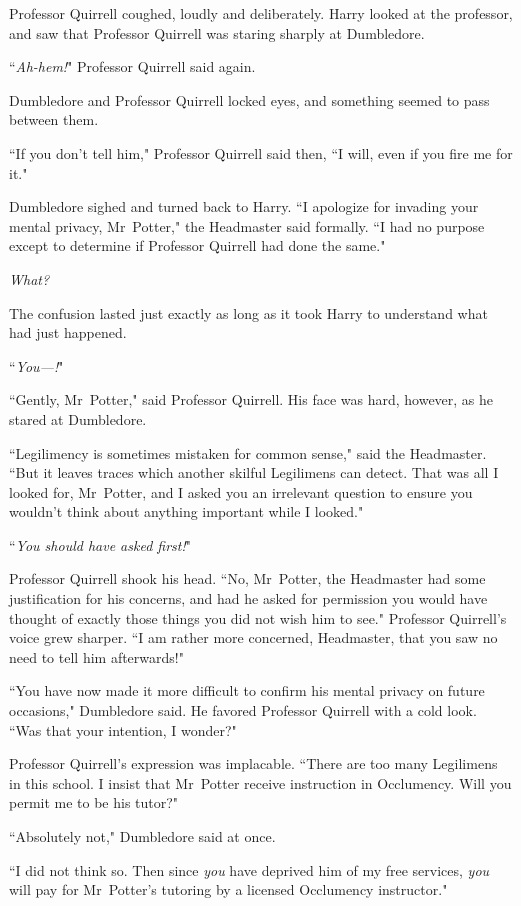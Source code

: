Professor Quirrell coughed, loudly and deliberately. Harry looked at the professor, and saw that Professor Quirrell was staring sharply at Dumbledore.

``\emph{Ah-hem!}" Professor Quirrell said again.

Dumbledore and Professor Quirrell locked eyes, and something seemed to pass between them.

``If you don't tell him," Professor Quirrell said then, ``I will, even if you fire me for it."

Dumbledore sighed and turned back to Harry. ``I apologize for invading your mental privacy, Mr~Potter," the Headmaster said formally. ``I had no purpose except to determine if Professor Quirrell had done the same."

\emph{What?}

The confusion lasted just exactly as long as it took Harry to understand what had just happened.

``\emph{You—!}"

``Gently, Mr~Potter," said Professor Quirrell. His face was hard, however, as he stared at Dumbledore.

``Legilimency is sometimes mistaken for common sense," said the Headmaster. ``But it leaves traces which another skilful Legilimens can detect. That was all I looked for, Mr~Potter, and I asked you an irrelevant question to ensure you wouldn't think about anything important while I looked."

``\emph{You should have asked first!}"

Professor Quirrell shook his head. ``No, Mr~Potter, the Headmaster had some justification for his concerns, and had he asked for permission you would have thought of exactly those things you did not wish him to see." Professor Quirrell's voice grew sharper. ``I am rather more concerned, Headmaster, that you saw no need to tell him afterwards!"

``You have now made it more difficult to confirm his mental privacy on future occasions," Dumbledore said. He favored Professor Quirrell with a cold look. ``Was that your intention, I wonder?"

Professor Quirrell's expression was implacable. ``There are too many Legilimens in this school. I insist that Mr~Potter receive instruction in Occlumency. Will you permit me to be his tutor?"

``Absolutely not," Dumbledore said at once.

``I did not think so. Then since \emph{you} have deprived him of my free services, \emph{you} will pay for Mr~Potter's tutoring by a licensed Occlumency instructor."

